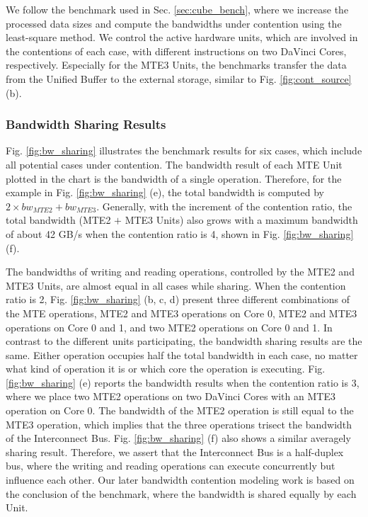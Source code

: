 \documentclass[12pt]{extbook}
\begin{document}
We follow the benchmark used in Sec. \ref{sec:cube_bench}, where we increase the processed data sizes and compute the bandwidths under contention using the least-square method. We control the active hardware units, which are involved in the contentions of each case, with different instructions on two DaVinci Cores, respectively. Especially for the MTE3 Units, the benchmarks transfer the data from the Unified Buffer to the external storage, similar to Fig. \ref{fig:cont_source} (b).

\subsubsection{Bandwidth Sharing Results \label{sec:bw_sr_res}}

Fig. \ref{fig:bw_sharing} illustrates the benchmark results for six cases, which include all potential cases under contention. The bandwidth result of each MTE Unit plotted in the chart is the bandwidth of a single operation. Therefore, for the example in Fig. \ref{fig:bw_sharing} (e), the total bandwidth is computed by $2 \times bw_{MTE2} + bw_{MTE3}$. Generally, with the increment of the contention ratio, the total bandwidth (MTE2 $+$ MTE3 Units) also grows with a maximum bandwidth of about 42 GB/s when the contention ratio is 4, shown in Fig. \ref{fig:bw_sharing} (f). 

The bandwidths of writing and reading operations, controlled by the MTE2 and MTE3 Units, are almost equal in all cases while sharing. When the contention ratio is 2, Fig. \ref{fig:bw_sharing} (b, c, d) present three different combinations of the MTE operations, MTE2 and MTE3 operations on Core 0, MTE2 and MTE3 operations on Core 0 and 1, and two MTE2 operations on Core 0 and 1. In contrast to the different units participating, the bandwidth sharing results are the same. Either operation occupies half the total bandwidth in each case, no matter what kind of operation it is or which core the operation is executing. Fig. \ref{fig:bw_sharing} (e) reports the bandwidth results when the contention ratio is 3, where we place two MTE2 operations on two DaVinci Cores with an MTE3 operation on Core 0. The bandwidth of the MTE2 operation is still equal to the MTE3 operation, which implies that the three operations trisect the bandwidth of the Interconnect Bus. Fig. \ref{fig:bw_sharing} (f) also shows a similar averagely sharing result. Therefore, we assert that the Interconnect Bus is a half-duplex bus, where the writing and reading operations can execute concurrently but influence each other. Our later bandwidth contention modeling work is based on the conclusion of the benchmark, where the bandwidth is shared equally by each Unit.
\end{document}
